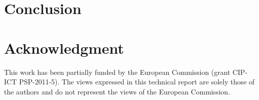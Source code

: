 \documentclass[draftclsnofoot,12pt,journal,onecolumn]{IEEEtran}
\begin{document}
\section{Conclusion}
\label{sec:conclusion}






%





\section*{Acknowledgment}

This work has been partially funded by the European Commission (grant CIP-ICT PSP-2011-5).
The views expressed in this technical report are solely those of the authors and do not represent the views of the European Commission.
\end{document}
